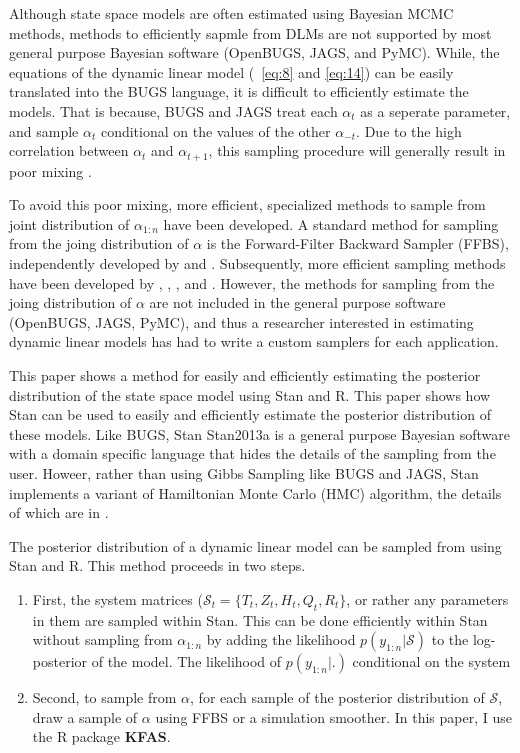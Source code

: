 \documentclass{article}
\begin{document}
Although state space models are often estimated using Bayesian MCMC methods, methods to efficiently sapmle from DLMs are not supported by most general purpose Bayesian software (OpenBUGS, JAGS, and PyMC).
While, the  equations of the dynamic linear model (~\eqref{eq:8} and \eqref{eq:14}) can be easily translated into the BUGS language, it is difficult to efficiently estimate the models.
That is because, BUGS and JAGS treat each $\alpha_{t}$ as a seperate parameter, and sample $\alpha_{t}$ conditional on the values of the other $\alpha_{-t}$.
Due to the high correlation between $\alpha_{t}$ and $\alpha_{t+1}$, this sampling procedure will generally result in poor mixing \parencite[477]{Jackman2009}.

To avoid this poor mixing, more efficient, specialized methods to sample from joint distribution of $\alpha_{1:n}$ have been developed.
A standard method for sampling from the joing distribution of $\alpha$ is the Forward-Filter Backward Sampler (FFBS), independently developed by \textcite{CarterKohn1994} and \textcite{Fruehwirth-Schnatter1994}.
Subsequently, more efficient sampling methods have been developed by \textcite{DeJongShephard1995}, \textcite{DurbinKoopman2002}, \textcite{StricklandTurnerDenhamEtAl2009}, and \textcite{ChanJeliazkov2009}.
However, the methods for sampling from the joing distribution of $\alpha$ are not included in the general purpose software (OpenBUGS, JAGS, PyMC), and thus a researcher interested in estimating dynamic linear models has had to write a custom samplers for each application.

This paper shows a method for easily and efficiently estimating the posterior distribution of the state space model using Stan and R.
This paper shows how Stan can be used to easily and efficiently estimate the posterior distribution of these models.
Like BUGS, Stan \textcite{Stan2013}{Stan2013a} is a general purpose Bayesian software with a domain specific language that hides the details of the sampling from the user.
Howeer, rather than using Gibbs Sampling like BUGS and JAGS, Stan implements a variant of Hamiltonian Monte Carlo (HMC) algorithm, the details of which are in \textcite{HoffmanGelman2013}.

The posterior distribution of a dynamic linear model can be sampled from using Stan and R.
This method proceeds in two steps.
\begin{enumerate}
\item First, the system matrices ($\mathcal{S}_{t} = \{T_{t}, Z_{t}, H_{t}, Q_{t}, R_{t}\}$, or rather any parameters in them are sampled within Stan. This can be done efficiently within Stan without sampling from $\alpha_{1:n}$ by adding the likelihood $p(y_{1:n} | \mathcal{S})$ to the log-posterior of the model.
The likelihood of $p(y_{1:n} | .)$ conditional on the system 
\item Second, to sample from $\alpha$, for each sample of the posterior distribution of $\mathcal{S}$, draw a sample of $\alpha$ using FFBS or a simulation smoother. In this paper, I use the R package \textbf{KFAS}.
\end{enumerate}
\end{document}
